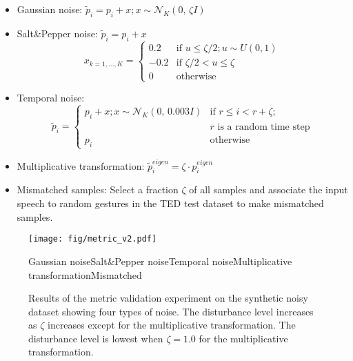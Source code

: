 \documentclass[acmtog]{acmart}
\begin{document}
\begin{itemize}
  \item Gaussian noise: $\tilde{p}_i = p_i + x; x \sim \mathcal{N}_K(0,\,\zeta{}I)$
  \item Salt\&Pepper noise: $\tilde{p}_i = p_i + x$
      \begin{equation*}
        x_{k=1,...,K} =
        \begin{cases}
          0.2 & \text{if $u \leq \zeta/2; u \sim U(0,1)$}\\
          -0.2 & \text{if $\zeta/2 < u \leq \zeta$}\\
          0 & \text{otherwise}
        \end{cases}       
      \end{equation*}
  \item Temporal noise:
      \begin{equation*}
        \tilde{p}_i =
        \begin{cases}
          p_i + x; x \sim \mathcal{N}_K(0,\,0.003{}I) & \text{if } r \leq i < r+\zeta;\\ 
            & \text{$r$ is a random time step}\\
p_i & \text{otherwise}
        \end{cases}       
      \end{equation*}
  \item Multiplicative transformation: $\tilde{p}_i^{eigen} = \zeta \cdot p_i^{eigen}$
  \item Mismatched samples: Select a fraction $\zeta$ of all samples and associate the input speech to random gestures in the TED test dataset to make mismatched samples.
\end{itemize}

\begin{figure*}
  \centering
  \texttt{[image: fig/metric\_v2.pdf]}
  \begin{minipage}{\textwidth}
    \footnotesize
    \hspace{1.8cm}Gaussian noise\hspace{1.3cm}Salt\&Pepper noise\hspace{1.1cm}Temporal noise\hspace{1.3cm}Multiplicative transformation\hspace{1.5cm}Mismatched
  \end{minipage}
  \caption{Results of the metric validation experiment on the synthetic noisy dataset showing four types of noise. The disturbance level increases as $\zeta$ increases except for the multiplicative transformation. The disturbance level is lowest when $\zeta=1.0$ for the multiplicative transformation.}
  \label{fig:metric}
\end{figure*}
\end{document}
